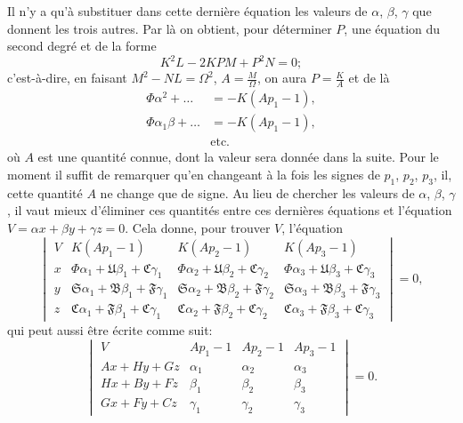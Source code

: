 \documentclass[11pt,a4paper]{book}
\begin{document}
Il n'y a qu'\`{a} substituer dans cette derni\`{e}re \'{e}quation les valeurs de $\alpha$, $\beta$, $\gamma$ que donnent les trois autres. Par l\`{a} on obtient, pour d\'{e}terminer $P$, une \'{e}quation du second degr\'{e} et de la forme
\begin{equation}\tag{13}
K^2 L - 2KP M + P^2 N = 0;
\end{equation}
c'est-\`{a}-dire, en faisant $M^2 - NL = \Omega^2$, $A = \frac{M}{\Omega}$, on aura $P = \frac{K}{A}$ et de l\`{a}
\begin{align}
\tag{14} \Phi \alpha^2 + \ldots &= -K(Ap_1 - 1), \\
\Phi \alpha_1 \beta + \ldots &= -K(Ap_1 - 1), \\
&\text{etc.}
\end{align}
o\`{u} $A$ est une quantit\'{e} connue, dont la valeur sera donn\'{e}e dans la suite. Pour le moment il suffit de remarquer qu'en changeant \`{a} la fois les signes de $p_1$, $p_2$, $p_3$, il, cette quantit\'{e} $A$ ne change que de signe. Au lieu de chercher les valeurs de $\alpha$, $\beta$, $\gamma$, il vaut mieux d'\'{e}liminer ces quantit\'{e}s entre ces derni\`{e}res \'{e}quations et l'\'{e}quation $V = \alpha x + \beta y + \gamma z = 0$. Cela donne, pour trouver $V$, l'\'{e}quation
\begin{equation}\tag{15}
\begin{vmatrix}
V & K(Ap_1 - 1) & K(Ap_2 - 1) & K(Ap_3 - 1) \\
x & \Phi \alpha_1 + \mathfrak{U}\beta_1 + \mathfrak{C}\gamma_1 & \Phi \alpha_2 + \mathfrak{U}\beta_2 + \mathfrak{C}\gamma_2 & \Phi \alpha_3 + \mathfrak{U}\beta_3 + \mathfrak{C}\gamma_3 \\
y & \mathfrak{S}\alpha_1 + \mathfrak{B}\beta_1 + \mathfrak{F}\gamma_1 & \mathfrak{S}\alpha_2 + \mathfrak{B}\beta_2 + \mathfrak{F}\gamma_2 & \mathfrak{S}\alpha_3 + \mathfrak{B}\beta_3 + \mathfrak{F}\gamma_3 \\
z & \mathfrak{C}\alpha_1 + \mathfrak{F}\beta_1 + \mathfrak{C}\gamma_1 & \mathfrak{C}\alpha_2 + \mathfrak{F}\beta_2 + \mathfrak{C}\gamma_2 & \mathfrak{C}\alpha_3 + \mathfrak{F}\beta_3 + \mathfrak{C}\gamma_3
\end{vmatrix} = 0,
\end{equation}
qui peut aussi \^{e}tre \'{e}crite comme suit:
\begin{equation}\tag{16}
\begin{vmatrix}
V & Ap_1 - 1 & Ap_2 - 1 & Ap_3 - 1 \\
Ax + Hy + Gz & \alpha_1 & \alpha_2 & \alpha_3 \\
Hx + By + Fz & \beta_1 & \beta_2 & \beta_3 \\
Gx + Fy + Cz & \gamma_1 & \gamma_2 & \gamma_3
\end{vmatrix} = 0.
\end{equation}
\end{document}
